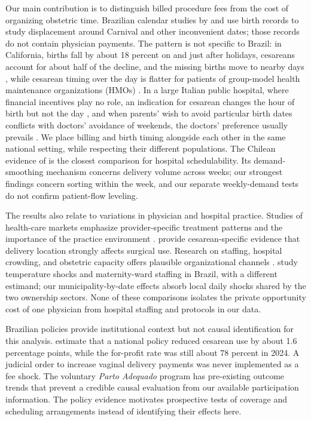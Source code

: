 \documentclass[12pt]{article}
\begin{document}
Our main contribution is to distinguish billed procedure fees from the cost of organizing obstetric time. Brazilian calendar studies by \citet{melo2024} and \citet{spinola2026} use birth records to study displacement around Carnival and other inconvenient dates; those records do not contain physician payments. The pattern is not specific to Brazil: in California, births fall by about 18 percent on and just after holidays, cesareans account for about half of the decline, and the missing births move to nearby days \citep{jacobson2021}, while cesarean timing over the day is flatter for patients of group-model health maintenance organizations (HMOs) \citep{spetz2001}. In a large Italian public hospital, where financial incentives play no role, an indication for cesarean changes the hour of birth but not the day \citep{fabbri2016}, and when parents' wish to avoid particular birth dates conflicts with doctors' avoidance of weekends, the doctors' preference usually prevails \citep{gans2012}. We place billing and birth timing alongside each other in the same national setting, while respecting their different populations. The Chilean evidence of \citet{elejalde2021} is the closest comparison for hospital schedulability. Its demand-smoothing mechanism concerns delivery volume across weeks; our strongest findings concern sorting within the week, and our separate weekly-demand tests do not confirm patient-flow leveling.

The results also relate to variations in physician and hospital practice. Studies of health-care markets emphasize provider-specific treatment patterns and the importance of the practice environment \citep{epstein2009,finkelstein2016,molitor2018,cutler2019}. \citet{fischer2026} provide cesarean-specific evidence that delivery location strongly affects surgical use. Research on staffing, hospital crowding, and obstetric capacity offers plausible organizational channels \citep{maibom2021,facchini2022,bachner2024,bensnes2026}. \citet{parfitt2026} study temperature shocks and maternity-ward staffing in Brazil, with a different estimand; our municipality-by-date effects absorb local daily shocks shared by the two ownership sectors. None of these comparisons isolates the private opportunity cost of one physician from hospital staffing and protocols in our data.

Brazilian policies provide institutional context but not causal identification for this analysis. \citet{melo2023} estimate that a national policy reduced cesarean use by about 1.6 percentage points, while the for-profit rate was still about 78 percent in 2024. A judicial order to increase vaginal delivery payments was never implemented as a fee shock. The voluntary \textit{Parto Adequado} program has pre-existing outcome trends that prevent a credible causal evaluation from our available participation information. The policy evidence motivates prospective tests of coverage and scheduling arrangements instead of identifying their effects here.
\end{document}
